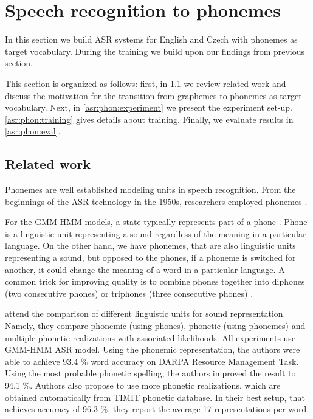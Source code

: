 \section{Speech recognition to phonemes}
\label{asr:transfer_phonemes}
In this section we build ASR systems for English and Czech with phonemes as target vocabulary. During the training we build upon our findings from previous section.

This section is organized as follows: first, in \cref{asr:phon:related} we review related work and discuss the motivation for the transition from graphemes to phonemes as target vocabulary. Next, in \cref{asr:phon:experiment} we present the experiment set-up. \cref{asr:phon:training} gives details about training. Finally, we evaluate results in \cref{asr:phon:eval}.

\subsection{Related work}
\label{asr:phon:related}

Phonemes are well established modeling units in speech recognition. From the beginnings of the ASR technology in the 1950s, researchers employed phonemes . 

For the GMM-HMM models, a state typically represents part of a phone . Phone is a linguistic unit representing a sound regardless of the meaning in a particular language. On the other hand, we have phonemes, that are also linguistic units representing a sound, but opposed to the phones, if a phoneme is switched for another, it could change the meaning of a word in a particular language. A common trick for improving quality is to combine phones together into diphones (two consecutive phones) or triphones (three consecutive phones) .  

 attend the comparison of different linguistic units for sound representation. Namely, they compare phonemic (using phones), phonetic (using phonemes) and multiple phonetic realizations with associated likelihoods. All experiments use GMM-HMM ASR model. Using the phonemic representation, the authors were able to achieve 93.4 \% word accuracy on DARPA Resource Management Task. Using the most probable phonetic spelling, the authors improved the result to 94.1 \%. Authors also propose to use more phonetic realizations, which are obtained automatically from TIMIT phonetic database. In their best setup, that achieves accuracy of 96.3 \%, they report the average 17 representations per word.

